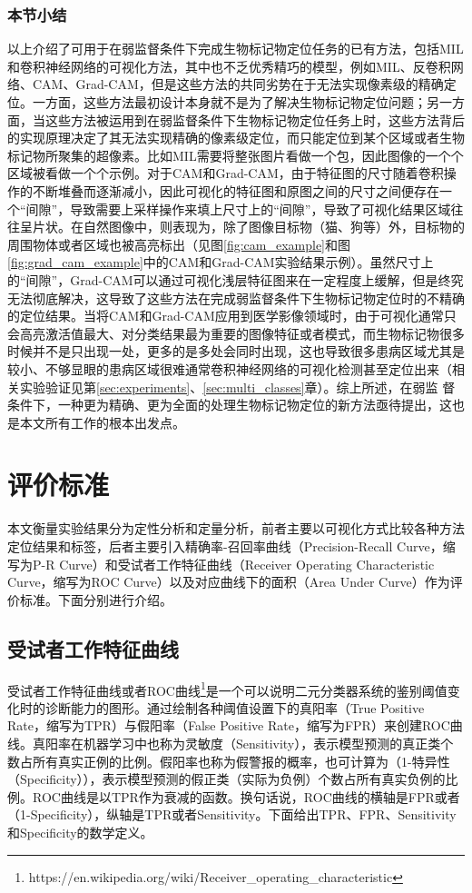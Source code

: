 \subsubsection{本节小结}\label{subsec:related_work_summary}
以上介绍了可用于在弱监督条件下完成生物标记物定位任务的已有方法，包括MIL和卷积神经网络的可视化方法，其中也不乏优秀精巧的模型，例如MIL、反卷积网络、CAM、Grad-CAM，但是这些方法的共同劣势在于无法实现像素级的精确定位。一方面，这些方法最初设计本身就不是为了解决生物标记物定位问题；另一方面，当这些方法被运用到在弱监督条件下生物标记物定位任务上时，这些方法背后的实现原理决定了其无法实现精确的像素级定位，而只能定位到某个区域或者生物标记物所聚集的超像素。比如MIL需要将整张图片看做一个包，因此图像的一个个区域被看做一个个示例。对于CAM和Grad-CAM，由于特征图的尺寸随着卷积操作的不断堆叠而逐渐减小，因此可视化的特征图和原图之间的尺寸之间便存在一个“间隙”，导致需要上采样操作来填上尺寸上的“间隙”，导致了可视化结果区域往往呈片状。在自然图像中，则表现为，除了图像目标物（猫、狗等）外，目标物的周围物体或者区域也被高亮标出（见图\ref{fig:cam_example}和图\ref{fig:grad_cam_example}中的CAM和Grad-CAM实验结果示例）。虽然尺寸上的“间隙”，Grad-CAM可以通过可视化浅层特征图来在一定程度上缓解，但是终究无法彻底解决，这导致了这些方法在完成弱监督条件下生物标记物定位时的不精确的定位结果。当将CAM和Grad-CAM应用到医学影像领域时，由于可视化通常只会高亮激活值最大、对分类结果最为重要的图像特征或者模式，而生物标记物很多时候并不是只出现一处，更多的是多处会同时出现，这也导致很多患病区域尤其是较小、不够显眼的患病区域很难通常卷积神经网络的可视化检测甚至定位出来（相关实验验证见第\ref{sec:experiments}、\ref{sec:multi_classes}章）。综上所述，在弱监
督条件下，一种更为精确、更为全面的处理生物标记物定位的新方法亟待提出，这也是本文所有工作的根本出发点。
\section{评价标准}
本文衡量实验结果分为定性分析和定量分析，前者主要以可视化方式比较各种方法定位结果和标签，后者主要引入精确率-召回率曲线（Precision-Recall Curve，缩写为P-R Curve）和受试者工作特征曲线（Receiver Operating Characteristic Curve，缩写为ROC Curve）以及对应曲线下的面积（Area Under Curve）作为评价标准。下面分别进行介绍。
\subsection{受试者工作特征曲线}\label{subsec:roc_curve}
受试者工作特征曲线或者ROC曲线\footnote{https://en.wikipedia.org/wiki/Receiver\_operating\_characteristic}是一个可以说明二元分类器系统的鉴别阈值变化时的诊断能力的图形。通过绘制各种阈值设置下的真阳率（True Positive Rate，缩写为TPR）与假阳率（False Positive Rate，缩写为FPR）来创建ROC曲线。真阳率在机器学习中也称为灵敏度（Sensitivity），表示模型预测的真正类个数占所有真实正例的比例。假阳率也称为假警报的概率，也可计算为（1-特异性（Specificity）），表示模型预测的假正类（实际为负例）个数占所有真实负例的比例。ROC曲线是以TPR作为衰减的函数。换句话说，ROC曲线的横轴是FPR或者（1-Specificity），纵轴是TPR或者Sensitivity。下面给出TPR、FPR、Sensitivity和Specificity的数学定义。


